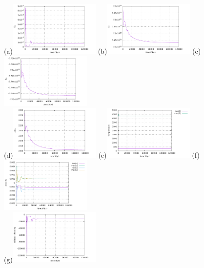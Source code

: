 \begin{center}
(a)\includegraphics[width=4.5cm]{python_codes/fieldstone_compressible2/EBA_105/EK}
(b)\includegraphics[width=4.5cm]{python_codes/fieldstone_compressible2/EBA_105/ET}
(c)\includegraphics[width=4.5cm]{python_codes/fieldstone_compressible2/EBA_105/EG}\\
(d)\includegraphics[width=4.5cm]{python_codes/fieldstone_compressible2/EBA_105/Tavrg}
(e)\includegraphics[width=4.5cm]{python_codes/fieldstone_compressible2/EBA_105/T_stats}
(f)\includegraphics[width=4.5cm]{python_codes/fieldstone_compressible2/EBA_105/vel_stats}\\
(g)\includegraphics[width=4.5cm]{python_codes/fieldstone_compressible2/EBA_105/adiabatic_heating}

\end{center}
